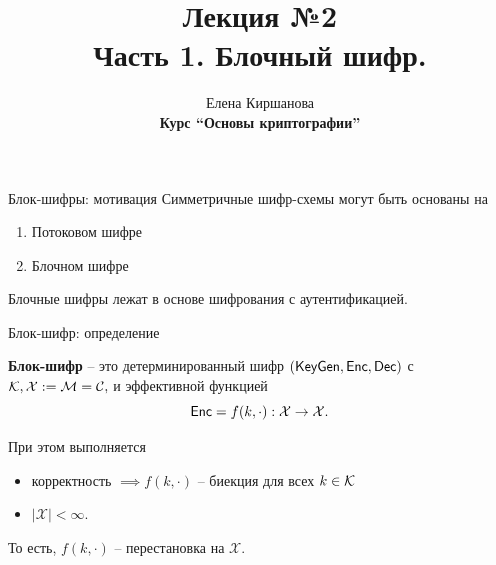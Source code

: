 \documentclass[usenames,dvipsnames,8pt,aspectratio=169]{beamer}
\title{Лекция №2 \\[10pt]
	Часть 1. Блочный шифр.}
\date{ Елена Киршанова \\  \textbf{Курс ``Основы криптографии''} \\  }
\begin{document}
	
\begin{frame}
	\titlepage
\end{frame}


\begin{frame}{Блок-шифры: мотивация}
\LARGE 
	Симметричные шифр-схемы могут быть основаны на
	
	\begin{enumerate}
		\itemsep 10pt
		\item Потоковом шифре 
		\item Блочном  шифре
	\end{enumerate}

	\vspace{20pt}
	Блочные шифры лежат в основе {\color{Orange} шифрования с аутентификацией.}
\end{frame}


\begin{frame}{Блок-шифр: определение}
\LARGE

		{\color{Orange}\textbf{Блок-шифр}} -- это {\color{Orange} детерминированный} шифр $(\textsf{KeyGen}, \textsf{Enc}, \textsf{Dec})$ с  $\mathcal{K}, \mathcal{X}:=\mathcal{M} = \mathcal{C}, $ и эффективной функцией
		\[
			\textsf{Enc} = f(k, \cdot): \mathcal{X} \rightarrow \mathcal{X}.
		\]
		
При этом выполняется
\begin{itemize}
	\item корректность $\implies f(k, \cdot)$ -- биекция для всех $k \in \mathcal{K}$ \\
	\item $|\mathcal{X}| < \infty$. \\
\end{itemize}

\vspace{20pt}

То есть, $f(k, \cdot)$ -- перестановка на $\mathcal{X}$. \\[10pt]


\end{frame}
\end{document}

